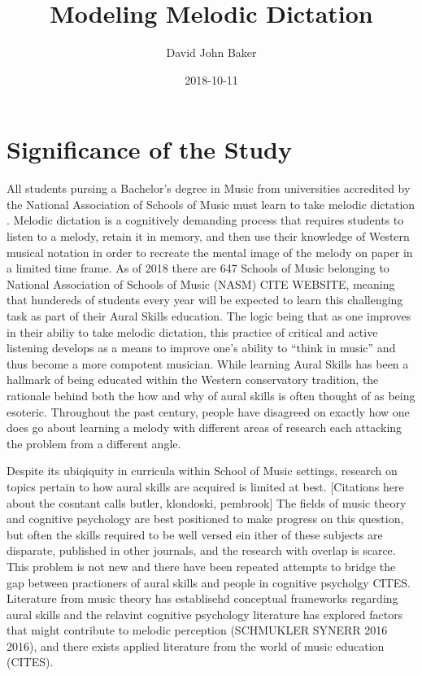 \documentclass[]{book}
\title{Modeling Melodic Dictation}
\author{David John Baker}
\date{2018-10-11}
\theoremstyle{definition}
\theoremstyle{definition}
\theoremstyle{definition}
\theoremstyle{remark}
\begin{document}
\maketitle

{
\setcounter{tocdepth}{1}
\tableofcontents
}
\hypertarget{significance-of-the-study}{%
\chapter{Significance of the Study}\label{significance-of-the-study}}

All students pursing a Bachelor's degree in Music from universities
accredited by the National Association of Schools of Music must learn to
take melodic dictation \citep[ Section
VIII.6.B.2.A]{NationalAssociationSchools2018}. Melodic dictation is a
cognitively demanding process that requires students to listen to a
melody, retain it in memory, and then use their knowledge of Western
musical notation in order to recreate the mental image of the melody on
paper in a limited time frame. As of 2018 there are 647 Schools of Music
belonging to National Association of Schools of Music (NASM) CITE
WEBSITE, meaning that hundereds of students every year will be expected
to learn this challenging task as part of their Aural Skills education.
The logic being that as one improves in their abiliy to take melodic
dictation, this practice of critical and active listening develops as a
means to improve one's ability to ``think in music'' and thus become a
more compotent musician. While learning Aural Skills has been a hallmark
of being educated within the Western conservatory tradition, the
rationale behind both the how and why of aural skills is often thought
of as being esoteric. Throughout the past century, people have disagreed
on exactly how one does go about learning a melody with different areas
of research each attacking the problem from a different angle.

Despite its ubiqiquity in curricula within School of Music settings,
research on topics pertain to how aural skills are acquired is limited
at best. {[}Citations here about the cosntant calls butler, klondoski,
pembrook{]} The fields of music theory and cognitive psychology are best
positioned to make progress on this question, but often the skills
required to be well versed ein ither of these subjects are disparate,
published in other journals, and the research with overlap is scarce.
This problem is not new and there have been repeated attempts to bridge
the gap between practioners of aural skills and people in cognitive
psycholgy CITES. Literature from music theory has establisehd conceptual
frameworks regarding aural skills
\citet{karpinskiAuralSkillsAcquisition2000} and the relavint cognitive
psychology literature has explored factors that might contribute to
melodic perception (SCHMUKLER SYNERR 2016 2016), and there exists
applied literature from the world of music education (CITES).
\end{document}

